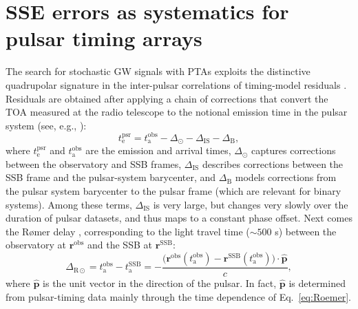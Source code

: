 \documentclass{aastex63}
\begin{document}
\section{SSE errors as systematics for pulsar timing arrays}
\label{sec:systematics}

The search for stochastic GW signals with PTAs exploits the distinctive quadrupolar signature in the inter-pulsar correlations of timing-model residuals \citep{hd83}.
Residuals are obtained after applying a chain of corrections that convert the TOA measured at the radio telescope to the notional emission time in the pulsar system (see, e.g., \citealt{ehm06}):
%
\begin{equation}
    t_\mathrm{e}^\mathrm{psr} = t_\mathrm{a}^\mathrm{obs} - \Delta_\odot - \Delta_\mathrm{IS} - \Delta_\mathrm{B},
\end{equation}
%
where $t_\mathrm{e}^\mathrm{psr}$ and $t_\mathrm{a}^\mathrm{obs}$ are the emission and arrival times, $\Delta_\odot$ captures corrections between the observatory and SSB frames, $\Delta_\mathrm{IS}$ describes corrections between the SSB frame and the pulsar-system barycenter, and $\Delta_\mathrm{B}$ models corrections from the pulsar system barycenter to the pulsar frame (which are relevant for binary systems).
Among these terms, $\Delta_\mathrm{IS}$ is very large, but changes very slowly over the duration of pulsar datasets, and thus maps to a constant phase offset. Next comes the R{\o}mer delay \citep{Roemer1676}, corresponding to the light travel time ($\sim 500$ s) between the observatory at $\mathbf{r}^\mathrm{obs}$ and the SSB at $\mathbf{r}^\mathrm{SSB}$:
%
\begin{equation}
\label{eq:Roemer}
\Delta_{\mathrm{R}\odot} =
t_\mathrm{a}^\mathrm{obs} - t_\mathrm{a}^\mathrm{SSB} =
-\frac{\bigl(\mathbf{r}^\mathrm{obs}(t_\mathrm{a}^\mathrm{obs}) - \mathbf{r}^\mathrm{SSB}(t_\mathrm{a}^\mathrm{obs})\bigr) \cdot \hat{\mathbf{p}}}{c},
\end{equation}
%
where $\hat{\mathbf{p}}$ is the unit vector in the direction of the pulsar. In fact, $\hat{\mathbf{p}}$ is determined from pulsar-timing data mainly through the time dependence of Eq.\ \eqref{eq:Roemer}. 
\end{document}
